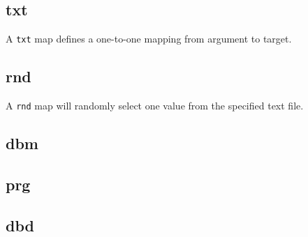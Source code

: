 \subsection{txt}
\label{rewritemap_txt}

A \verb~txt~ map defines a one-to-one mapping from argument to target.

\subsection{rnd}
\label{rewritemap_rnd}

A \verb~rnd~ map will randomly select one value from the specified text file.

\subsection{dbm}
\label{rewritemap_dbm}

\subsection{prg}
\label{rewritemap_prg}

\subsection{dbd}
\label{rewritemap_dbd}

